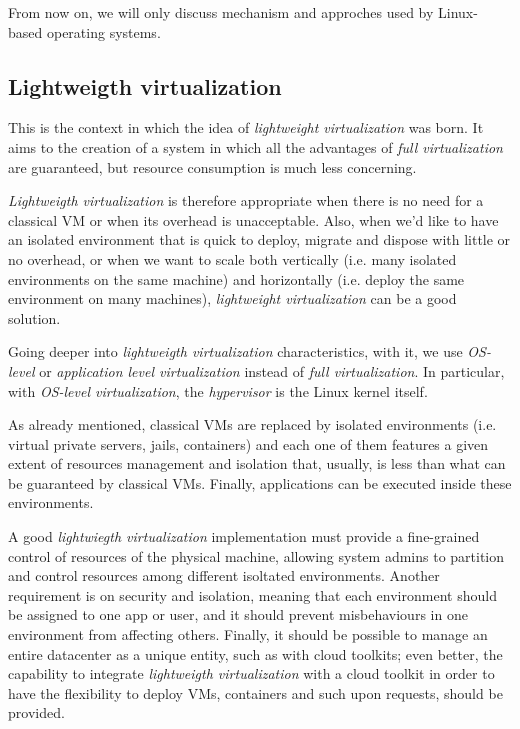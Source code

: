 \begin{note}
    From now on, we will only discuss mechanism and approches used by Linux-based
    operating systems.
\end{note}

\subsection{Lightweigth virtualization}
This is the context in which the idea of \emph{lightweight virtualization} was
born. It aims to the creation of a system in which all the advantages of \emph{full
virtualization} are guaranteed, but resource consumption is much less concerning.

\emph{Lightweigth virtualization} is therefore appropriate when there is no need
for a classical VM or when its overhead is unacceptable. Also, when we'd like to
have an isolated environment that is quick to deploy, migrate and dispose with
little or no overhead, or when we want to scale both vertically (i.e. many
isolated environments on the same machine) and horizontally (i.e. deploy the
same environment on many machines), \emph{lightweight virtualization} can be a
good solution.

\bigskip\noindent
Going deeper into \emph{lightweigth virtualization} characteristics, with it,
we use \emph{OS-level} or \emph{application level virtualization} instead of
\emph{full virtualization}. In particular, with \emph{OS-level virtualization},
the \emph{hypervisor} is the Linux kernel itself.

As already mentioned, classical VMs are replaced by isolated environments (i.e.
virtual private servers, jails, containers) and each one of them features a
given extent of resources management and isolation that, usually, is less than
what can be guaranteed by classical VMs. Finally, applications can be executed
inside these environments.

A good \emph{lightwiegth virtualization} implementation must provide a
fine-grained control of resources of the physical machine, allowing system
admins to partition and control resources among different isoltated environments.
Another requirement is on security and isolation, meaning that each environment
should be assigned to one app or user, and it should prevent misbehaviours in
one environment from affecting others. Finally, it should be possible to manage
an entire datacenter as a unique entity, such as with cloud toolkits; even better,
the capability to integrate \emph{lightweigth virtualization} with a cloud
toolkit in order to have the flexibility to deploy VMs, containers and such upon
requests, should be provided.

